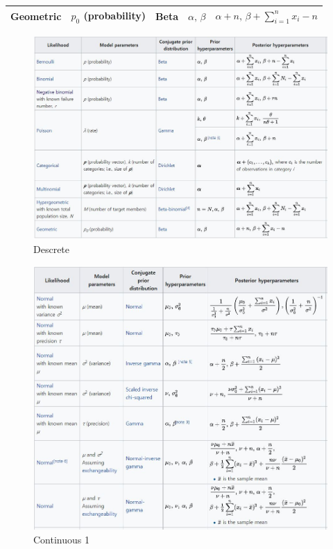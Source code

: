 \documentclass[11pt]{article}
\begin{document}
\begin{table}[]
\begin{tabular}{|c|c|c|c|c|}
Geometric                                                                                          & $p_{0}$ (probability)                                                                            & Beta          & $\alpha ,\,\beta \!$     & $\alpha +n,\,\beta +\sum _{i=1}^{n}x_{i}-n\!$                                       \\ \hline
\end{tabular}
\end{table}


\begin{figure}[htbp]
\begin{center}
    \includegraphics[scale=0.8]{Discrete}
    \caption{Descrete} \label{fig:label}
\end{center}
\end{figure}

\begin{figure}[htbp]
\begin{center}
    \includegraphics[scale=0.8]{Con1}
    \caption{Continuous 1} \label{fig:label}
\end{center}
\end{figure}
\end{document}
